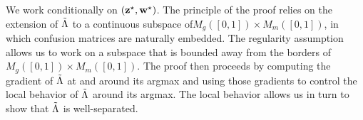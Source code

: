 
\proofbegin

We work conditionally on $(\mathbf{z}^\star, \mathbf{w}^\star)$. The principle of the proof relies on the extension of $\tilde{\Lambda}$ to a continuous subspace of$ M_g([0, 1]) \times M_m([0, 1])$, in which confusion matrices are naturally embedded. The regularity assumption allows us to work on a subspace that is bounded away from the borders of $M_g([0, 1]) \times M_m([0, 1])$. The proof then proceeds by computing the gradient of $\tilde{\Lambda}$ at and around its argmax and using those gradients to control the local behavior of $\tilde{\Lambda}$ around its argmax. The local behavior allows us in turn to show that $\tilde{\Lambda}$ is well-separated. 


